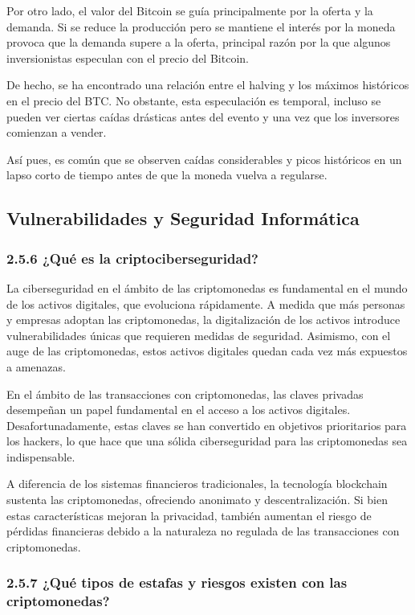 \documentclass[12pt,a4paper]{article}
\begin{document}
Por otro lado, el valor del Bitcoin se guía principalmente por la oferta y la demanda. Si se reduce la producción pero se mantiene el interés por la moneda provoca que la demanda supere a la oferta, principal razón por la que algunos inversionistas especulan con el precio del Bitcoin.

De hecho, se ha encontrado una relación entre el halving y los máximos históricos en el precio del BTC. No obstante, esta especulación es temporal, incluso se pueden ver ciertas caídas drásticas antes del evento y una vez que los inversores comienzan a vender.

Así pues, es común que se observen caídas considerables y picos históricos en un lapso corto de tiempo antes de que la moneda vuelva a regularse.

\subsection*{Vulnerabilidades y Seguridad Informática}

\subsubsection*{2.5.6 ¿Qué es la criptociberseguridad?}

La ciberseguridad en el ámbito de las criptomonedas es fundamental en el mundo de los activos digitales, que evoluciona rápidamente. A medida que más personas y empresas adoptan las criptomonedas, la digitalización de los activos introduce vulnerabilidades únicas que requieren medidas de seguridad. Asimismo, con el auge de las criptomonedas, estos activos digitales quedan cada vez más expuestos a amenazas.

En el ámbito de las transacciones con criptomonedas, las claves privadas desempeñan un papel fundamental en el acceso a los activos digitales. Desafortunadamente, estas claves se han convertido en objetivos prioritarios para los hackers, lo que hace que una sólida ciberseguridad para las criptomonedas sea indispensable.

A diferencia de los sistemas financieros tradicionales, la tecnología blockchain sustenta las criptomonedas, ofreciendo anonimato y descentralización. Si bien estas características mejoran la privacidad, también aumentan el riesgo de pérdidas financieras debido a la naturaleza no regulada de las transacciones con criptomonedas.

\subsubsection*{2.5.7 ¿Qué tipos de estafas y riesgos existen con las criptomonedas?}
\end{document}
